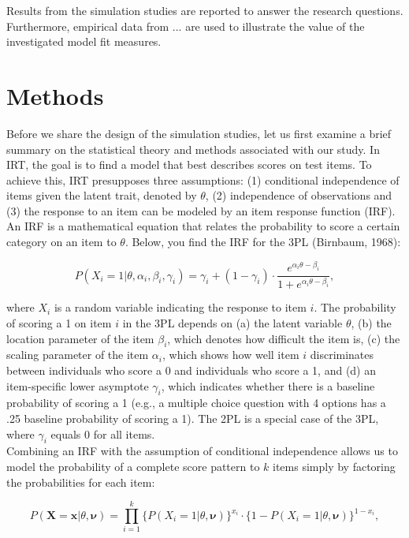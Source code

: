\documentclass[Royal,sageapa,times,doublespace]{sagej}
\begin{document}
Results from the simulation studies are reported to answer the research questions. Furthermore, empirical data from ... are used to illustrate the value of the investigated model fit measures.

\section{Methods}
Before we share the design of the simulation studies, let us first examine a brief summary on the statistical theory and methods associated with our study. In IRT, the goal is to find a model that best describes scores on test items. To achieve this, IRT presupposes three assumptions: (1) conditional independence of items given the latent trait, denoted by $\theta$, (2) independence of observations and (3) the response to an item can be modeled by an item response function (IRF). An IRF is a mathematical equation that relates the probability to score a certain category on an item to $\theta$. Below, you find the IRF for the 3PL (Birnbaum, 1968):

\begin{equation}
P(X_i = 1 | \theta, \alpha_{i}, \beta_{i}, \gamma_{i}) = \gamma_{i} + (1 - \gamma_{i}) \cdot 
\frac{e^{\alpha_{i}\theta - \beta_{i}}}{1 + e^{\alpha_{i}\theta - \beta_{i}}},
\end{equation}

where $X_i$ is a random variable indicating the response to item $i$. The probability of scoring a 1 on item $i$ in the 3PL depends on (a) the latent variable $\theta$, (b) the location parameter of the item $\beta_{i}$, which denotes how difficult the item is, (c) the scaling parameter of the item $\alpha_{i}$, which shows how well item $i$ discriminates between individuals who score a 0 and individuals who score a 1, and (d) an item-specific lower asymptote $\gamma_{i}$, which indicates whether there is a baseline probability of scoring a 1 (e.g., a multiple choice question with 4 options has a .25 baseline probability of scoring a 1). The 2PL is a special case of the 3PL, where $\gamma_{i}$ equals 0 for all items. \\
\indent Combining an IRF with the assumption of conditional independence allows us to model the probability of a complete score pattern to $k$ items simply by factoring the probabilities for each item:

\begin{equation}
P(\boldsymbol{X} = \boldsymbol{x} | \theta, \boldsymbol{\nu}) = \prod_{i=1}^{k} \{P(X_i = 1 | \theta, \boldsymbol{\nu})\}^{x_i} \cdot  \{1 - P(X_i = 1 | \theta, \boldsymbol{\nu}) \}^{1 - x_i},
\end{equation}
\end{document}
